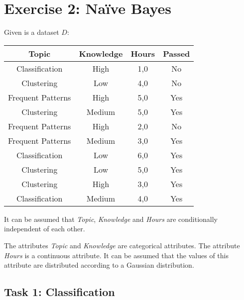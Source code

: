 \documentclass[
english,
smallborders
]{i6prcsht}
\begin{document}
\newpage

\section*{Exercise 2: Naïve Bayes}

Given is a dataset $D$:

\begin{center}
	\begin{tabular}{|c|c|c|c|}
		\hline
		\textbf{Topic}    & \textbf{Knowledge} & \textbf{Hours} & \textbf{Passed} \\ \hline
		Classification    & High               & 1,0            & No              \\ \hline
		Clustering        & Low                & 4,0            & No              \\ \hline
		Frequent Patterns & High               & 5,0            & Yes             \\ \hline
		Clustering        & Medium             & 5,0            & Yes             \\ \hline
		Frequent Patterns & High               & 2,0            & No              \\ \hline
		Frequent Patterns & Medium             & 3,0            & Yes             \\ \hline
		Classification    & Low                & 6,0            & Yes             \\ \hline
		Clustering        & Low                & 5,0            & Yes             \\ \hline
		Clustering        & High               & 3,0            & Yes             \\ \hline
		Classification    & Medium             & 4,0            & Yes             \\ \hline
	\end{tabular}
\end{center}

It can be assumed that \textit{Topic}, \textit{Knowledge} and \textit{Hours} are conditionally independent of each other.

The attributes \textit{Topic} and \textit{Knowledge} are categorical attributes. \newline
The attribute \textit{Hours} is a continuous attribute. It can be assumed that the values of this attribute are distributed according to a Gaussian distribution.

\subsection*{Task 1: Classification}
\end{document}
